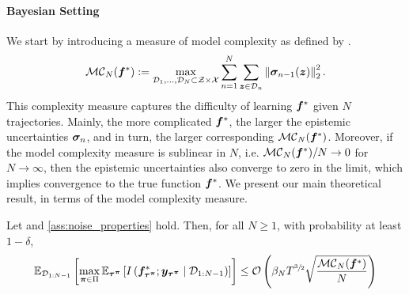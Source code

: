 \paragraph{Bayesian Setting}
We start by introducing a measure of model complexity as defined by \citet{curi2020efficient}.
\begin{equation}
    {{\mathcal{M}}{\mathcal{C}}}_N({\bm{f}}^*) := \underset{{\mathcal{D}}_1, \dots, {\mathcal{D}}_N \subset {\mathcal{Z}} \times {\mathcal{X}}}{\max}\sum^{N}_{n=1} \sum_{{\bm{z}} \in {\mathcal{D}}_n} \left\lVert{\bm{\sigma}}_{n-1}({\bm{z}})\right\rVert^2_2.
\end{equation}
This complexity measure captures the difficulty of learning ${\bm{f}}^*$ given $N$ trajectories. Mainly, the more complicated ${\bm{f}}^*$, the larger the epistemic uncertainties ${\bm{\sigma}}_n$, and in turn, the larger corresponding ${{\mathcal{M}}{\mathcal{C}}}_N({\bm{f}}^*)$. Moreover, if the model complexity measure is sublinear in $N$, i.e. ${{\mathcal{M}}{\mathcal{C}}}_N({\bm{f}}^*)/N \rightarrow 0$ for $N\rightarrow \infty$, then the epistemic uncertainties also converge to zero in the limit, 
which implies convergence to the true function ${\bm{f}}^*$.
We present our main theoretical result, in terms of the model complexity measure.
\begin{theorem}\label{thm:main_theorem}
Let  and \ref{ass:noise_properties} hold. Then, for all $N \geq 1$, with probability at least $1-\delta$,
\begin{equation}
    \mathbb{E}_{{\mathcal{D}}_{1:N-1}}\left[\max_{{\bm{\pi}} \in \Pi}\mathbb{E}_{{\bm{\tau}}^{{\bm{\pi}}}}\left[I\left({\bm{f}}^*_{{\bm{\tau}}^{{\bm{\pi}}}}; {\bm{y}}_{{\bm{\tau}}^{{\bm{\pi}}}} \mid {\mathcal{D}}_{1:N-1}\right)\right]\right] \le {\mathcal{O}} \left(\beta_N T^{\sfrac{3}{2}}\sqrt{\frac{{{\mathcal{M}}{\mathcal{C}}}_N({\bm{f}}^*)}{N}}\right)
    \label{eq:bound_general}
\end{equation}
\end{theorem}
